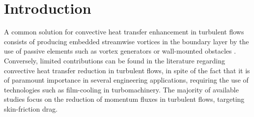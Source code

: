 

\newcommand{\red}[1]{\textcolor{rr}{#1}}
\newcommand{\green}[1]{\textcolor{gg}{#1}}

\section{Introduction}
A common solution for convective heat transfer enhancement in turbulent flows consists of producing embedded streamwise vortices in the boundary layer \citep{jacobi1995} by the use of passive elements such as vortex generators \citep{Zhaoqing2019VG} or wall-mounted obstacles \citep{nakamura2001cube,mallor2018cubes}.
Conversely, limited contributions can be found in the literature regarding convective heat transfer reduction in turbulent flows, in spite of the fact that it is of paramount importance in several engineering applications, requiring the use of technologies such as film-cooling in turbomachinery. The majority of available studies focus on the reduction of momentum fluxes in turbulent flows, targeting skin-friction drag.

